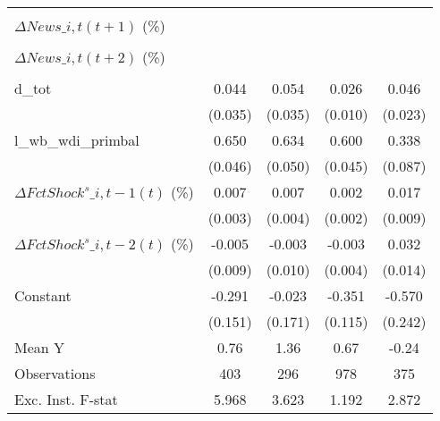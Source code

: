 {\begin{tabular}{l*{4}{c}}
                    &                     &                     &                     &                     \\
\addlinespace
$ \Delta News\_{i,t}(t+1)$ (\%)&                     &                     &                     &                     \\
                    &                     &                     &                     &                     \\
\addlinespace
$ \Delta News\_{i,t}(t+2)$ (\%)&                     &                     &                     &                     \\
                    &                     &                     &                     &                     \\
\addlinespace
d\_tot               &       0.044         &       0.054         &       0.026\sym{**} &       0.046\sym{*}  \\
                    &     (0.035)         &     (0.035)         &     (0.010)         &     (0.023)         \\
\addlinespace
l\_wb\_wdi\_primbal    &       0.650\sym{***}&       0.634\sym{***}&       0.600\sym{***}&       0.338\sym{***}\\
                    &     (0.046)         &     (0.050)         &     (0.045)         &     (0.087)         \\
\addlinespace
$ \Delta FctShock^s\_{i,t-1}(t)$ (\%)&       0.007\sym{**} &       0.007\sym{*}  &       0.002         &       0.017\sym{*}  \\
                    &     (0.003)         &     (0.004)         &     (0.002)         &     (0.009)         \\
\addlinespace
$ \Delta FctShock^s\_{i,t-2}(t)$ (\%)&      -0.005         &      -0.003         &      -0.003         &       0.032\sym{**} \\
                    &     (0.009)         &     (0.010)         &     (0.004)         &     (0.014)         \\
\addlinespace
Constant            &      -0.291\sym{*}  &      -0.023         &      -0.351\sym{***}&      -0.570\sym{**} \\
                    &     (0.151)         &     (0.171)         &     (0.115)         &     (0.242)         \\
\midrule
Mean Y              &        0.76         &        1.36         &        0.67         &       -0.24         \\
Observations        &         403         &         296         &         978         &         375         \\
Exc. Inst. F-stat   &       5.968         &       3.623         &       1.192         &       2.872         \\
\bottomrule
\end{tabular}
}
